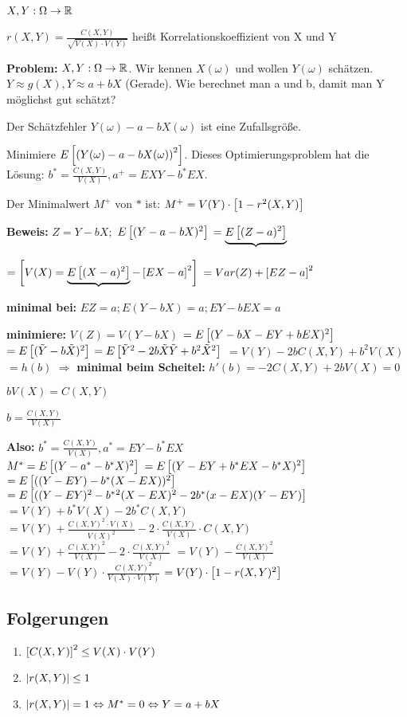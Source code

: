 \begin{defi}
$X,Y: \Omega \rightarrow \mathbb{R}$

$r(X,Y) = \frac{C(X,Y)}{\sqrt{V(X) \cdot V(Y)}}$ heißt Korrelationskoeffizient von X und Y
\end{defi}

\textbf{Problem:}
$X,Y: \Omega \rightarrow \mathbb{R}$. Wir kennen $X(\omega)$ und wollen $Y(\omega)$ schätzen. $Y \approx g(X), Y \approx a+bX$ (Gerade). Wie berechnet man a und b, damit man Y möglichst gut schätzt? 

Der Schätzfehler $Y(\omega) - a - b X(\omega)$ ist eine Zufallsgröße.

Minimiere $E \left[  \left( Y(\omega) - a - b X(\omega) \right) ^2 \right] $. Dieses Optimierungsproblem hat die Lösung:
$b^* = \frac{C(X,Y)}{V(X)}, a^+ = EXY - b^* EX$.

Der Minimalwert $M^+$ von $*$ ist:
$M^+ = V(Y) \cdot  \left[ 1-r^2(X,Y) \right] $

\textbf{Beweis:} $Z=Y-bX;$
$ E \left[ (Y-a-bX)^2 \right] $
$=\underbrace{E \left[ (Z-a)^2 \right] }$

$= \left[ V(X) = \underbrace{E \left[ (X-a)^2 \right] } -  \left[ EX-a \right] ^2 \right] $
$=Var(Z) +  \left[ EZ-a \right] ^2$

\textbf{minimal bei:} $EZ =a; E(Y-bX) = a; EY -bEX= a$

\textbf{minimiere:} $V(Z) = V(Y-bX)$
$=E \left[ (Y-bX - EY + bEX)^2 \right] $
$=E  \left[ (\tilde{Y} - b\tilde{X})^2 \right] $
$=E \left[ \tilde{Y}^2 - 2b \tilde{X}\tilde{Y} + b^2 \tilde{X}^2 \right] $
$=V(Y) -2b C(X,Y) + b^2 V(X) $
$=h(b)$
$\Rightarrow$ \textbf{minimal beim Scheitel:} 
$ h'(b) = -2 C(X,Y) + 2b V(X) = 0$

$b V(X) = C(X,Y)$

$b = \frac{C(X,Y)}{V(X)}$

\textbf{Also: } $b^* = \frac{C(X,Y)}{V(X)}, a^* = EY - b^* EX$\\

$M^* = E \left[  (Y-a^* - b^* X)^2  \right] $
$= E  \left[  (Y-EY + b^* EX - b^* X)^2  \right] $
$= E  \left[  ((Y-EY) - b^* (X - EX))^2  \right] $
$= E  \left[  ((Y-EY)^2 - b^*{^2} (X - EX)^2 - 2b^* (x-EX) (Y-EY)  \right] $
$= V(Y) + b^* V(X) - 2 b^* C(X,Y)$
$=V(Y) + \frac{C(X,Y)^2 \cdot V(X)}{V(X)^2} - 2 \cdot \frac{C(X,Y)}{V(X)} \cdot C(X,Y)$
$=V(Y) + \frac{C(X,Y)^2}{V(X)} - 2 \cdot \frac{C(X,Y)^2}{V(X)}$
$=V(Y) - \frac{C(X,Y)^2}{V(X)}$
$=V(Y) - V(Y) \cdot \frac{C(X,Y)^2}{V(X)\cdot V(Y)}$
$=V(Y) \cdot  \left[ 1 - r(X,Y)^2 \right] $

\subsection{Folgerungen}

\begin{enumerate}
\item $ \left[ C(X,Y) \right] ^2 \leq V(X) \cdot V(Y)$
\item $ \left\vert r(X,Y) \right\vert  \leq 1$
\item $ \left\vert r(X,Y) \right\vert  = 1 \Leftrightarrow M^* = 0 \Leftrightarrow Y = a+bX$
\end{enumerate}